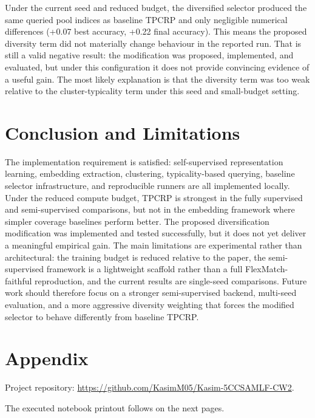 \documentclass[10pt]{article}
\begin{document}
Under the current seed and reduced budget, the diversified selector produced the same queried pool indices as baseline TPCRP and only negligible numerical differences (+0.07 best accuracy, +0.22 final accuracy). This means the proposed diversity term did not materially change behaviour in the reported run. That is still a valid negative result: the modification was proposed, implemented, and evaluated, but under this configuration it does not provide convincing evidence of a useful gain. The most likely explanation is that the diversity term was too weak relative to the cluster-typicality term under this seed and small-budget setting.

\section{Conclusion and Limitations}
The implementation requirement is satisfied: self-supervised representation learning, embedding extraction, clustering, typicality-based querying, baseline selector infrastructure, and reproducible runners are all implemented locally. Under the reduced compute budget, TPCRP is strongest in the fully supervised and semi-supervised comparisons, but not in the embedding framework where simpler coverage baselines perform better. The proposed diversification modification was implemented and tested successfully, but it does not yet deliver a meaningful empirical gain. The main limitations are experimental rather than architectural: the training budget is reduced relative to the paper, the semi-supervised framework is a lightweight scaffold rather than a full FlexMatch-faithful reproduction, and the current results are single-seed comparisons. Future work should therefore focus on a stronger semi-supervised backend, multi-seed evaluation, and a more aggressive diversity weighting that forces the modified selector to behave differently from baseline TPCRP.

\appendix
\section*{Appendix}
Project repository: \url{https://github.com/KasimM05/Kasim-5CCSAMLF-CW2}.

The executed notebook printout follows on the next pages.


\end{document}
